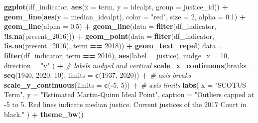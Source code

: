 \documentclass[
]{book}
\newenvironment{Shaded}{\begin{snugshade}}{\end{snugshade}}
\newcommand{\CommentTok}[1]{\textcolor[rgb]{0.56,0.35,0.01}{\textit{#1}}}
\newcommand{\DataTypeTok}[1]{\textcolor[rgb]{0.13,0.29,0.53}{#1}}
\newcommand{\DecValTok}[1]{\textcolor[rgb]{0.00,0.00,0.81}{#1}}
\newcommand{\FloatTok}[1]{\textcolor[rgb]{0.00,0.00,0.81}{#1}}
\newcommand{\KeywordTok}[1]{\textcolor[rgb]{0.13,0.29,0.53}{\textbf{#1}}}
\newcommand{\NormalTok}[1]{#1}
\newcommand{\OperatorTok}[1]{\textcolor[rgb]{0.81,0.36,0.00}{\textbf{#1}}}
\newcommand{\StringTok}[1]{\textcolor[rgb]{0.31,0.60,0.02}{#1}}
\theoremstyle{definition}
\theoremstyle{definition}
\theoremstyle{definition}
\theoremstyle{remark}
\begin{document}
\begin{Shaded}
\begin{Highlighting}[]
\KeywordTok{ggplot}\NormalTok{(df\_indicator, }\KeywordTok{aes}\NormalTok{(}\DataTypeTok{x =}\NormalTok{ term, }\DataTypeTok{y =}\NormalTok{ idealpt, }\DataTypeTok{group =}\NormalTok{ justice\_id)) }\OperatorTok{+}
\StringTok{  }\KeywordTok{geom\_line}\NormalTok{(}\KeywordTok{aes}\NormalTok{(}\DataTypeTok{y =}\NormalTok{ median\_idealpt), }\DataTypeTok{color =} \StringTok{"red"}\NormalTok{, }\DataTypeTok{size =} \DecValTok{2}\NormalTok{, }\DataTypeTok{alpha =} \FloatTok{0.1}\NormalTok{) }\OperatorTok{+}
\StringTok{  }\KeywordTok{geom\_line}\NormalTok{(}\DataTypeTok{alpha =} \FloatTok{0.5}\NormalTok{) }\OperatorTok{+}
\StringTok{  }\KeywordTok{geom\_line}\NormalTok{(}\DataTypeTok{data =} \KeywordTok{filter}\NormalTok{(df\_indicator, }\OperatorTok{!}\KeywordTok{is.na}\NormalTok{(present\_}\DecValTok{2016}\NormalTok{))) }\OperatorTok{+}
\StringTok{  }\KeywordTok{geom\_point}\NormalTok{(}\DataTypeTok{data =} \KeywordTok{filter}\NormalTok{(df\_indicator, }\OperatorTok{!}\KeywordTok{is.na}\NormalTok{(present\_}\DecValTok{2016}\NormalTok{), term }\OperatorTok{==}\StringTok{ }\DecValTok{2018}\NormalTok{)) }\OperatorTok{+}
\StringTok{  }\KeywordTok{geom\_text\_repel}\NormalTok{(}
    \DataTypeTok{data =} \KeywordTok{filter}\NormalTok{(df\_indicator, term }\OperatorTok{==}\StringTok{ }\DecValTok{2016}\NormalTok{), }\KeywordTok{aes}\NormalTok{(}\DataTypeTok{label =}\NormalTok{ justice),}
    \DataTypeTok{nudge\_x =} \DecValTok{10}\NormalTok{,}
    \DataTypeTok{direction =} \StringTok{"y"}
\NormalTok{  ) }\OperatorTok{+}\StringTok{ }\CommentTok{\# labels nudged and vertical}
\StringTok{  }\KeywordTok{scale\_x\_continuous}\NormalTok{(}\DataTypeTok{breaks =} \KeywordTok{seq}\NormalTok{(}\DecValTok{1940}\NormalTok{, }\DecValTok{2020}\NormalTok{, }\DecValTok{10}\NormalTok{), }\DataTypeTok{limits =} \KeywordTok{c}\NormalTok{(}\DecValTok{1937}\NormalTok{, }\DecValTok{2020}\NormalTok{)) }\OperatorTok{+}\StringTok{ }\CommentTok{\# axis breaks}
\StringTok{  }\KeywordTok{scale\_y\_continuous}\NormalTok{(}\DataTypeTok{limits =} \KeywordTok{c}\NormalTok{(}\OperatorTok{{-}}\DecValTok{5}\NormalTok{, }\DecValTok{5}\NormalTok{)) }\OperatorTok{+}\StringTok{ }\CommentTok{\# axis limits}
\StringTok{  }\KeywordTok{labs}\NormalTok{(}
    \DataTypeTok{x =} \StringTok{"SCOTUS Term"}\NormalTok{,}
    \DataTypeTok{y =} \StringTok{"Estimated Martin{-}Quinn Ideal Point"}\NormalTok{,}
    \DataTypeTok{caption =} \StringTok{"Outliers capped at {-}5 to 5. Red lines indicate median justice. Current justices of the 2017 Court in black."}
\NormalTok{  ) }\OperatorTok{+}
\StringTok{  }\KeywordTok{theme\_bw}\NormalTok{()}
\end{Highlighting}
\end{Shaded}
\end{document}
